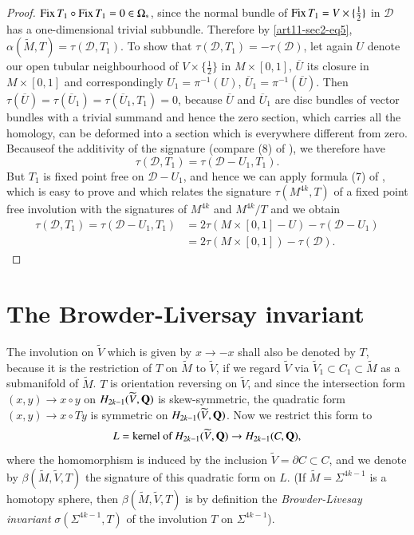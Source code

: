 \begin{proof}
$\operatorname{\mathrm{Fix}} T_{1}\circ \operatorname{\mathrm{Fix}} T_{1}=0\in \Omega_{*}$, since the normal bundle of $\operatorname{\mathrm{Fix}} T_{1}=V\times \{\frac{1}{2}\}$ in $\mathscr{D}$ has a one-dimensional trivial subbundle. Therefore by \eqref{art11-sec2-eq5}, $\alpha(\widetilde{M},T)=\tau(\mathscr{D},T_{1})$. To show that $\tau(\mathscr{D},T_{1})=-\tau(\mathscr{D})$, let again $U$ denote our open tubular neighbourhood of $V\times \{\frac{1}{2}\}$ in $M\times [0,1]$, $\overline{U}$ its closure in $M\times [0,1]$ and correspondingly $U_{1}=\pi^{-1}(U)$, $\overline{U}_{1}=\pi^{-1}(\overline{U})$. Then $\tau(\overline{U})=\tau(\overline{U}_{1})=\tau(\overline{U}_{1},T_{1})=0$, because $\overline{U}$ and $\overline{U}_{1}$ are disc bundles of vector bundles with a trivial summand and hence the zero section, which carries all the homology, can be deformed into a section which is everywhere different from zero. Because\pageoriginale of the additivity of the signature (compare (8) of \cite{art11-key7}), we therefore have
$$
\tau(\mathscr{D},T_{1})=\tau(\mathscr{D}-U_{1},T_{1}).
$$
But $T_{1}$ is fixed point free on $\mathscr{D}-U_{1}$, and hence we can apply formula (7) of \cite{art11-key7}, which is easy to prove and which relates the signature $\tau(M^{4k},T)$ of a fixed point free involution with the signatures of $M^{4k}$ and $M^{4k}/T$ and we obtain
\begin{align*}
\tau(\mathscr{D},T_{1})=\tau(\mathscr{D}-U_{1},T_{1}) &= 2\tau(M\times [0,1]-U)-\tau(\mathscr{D}-U_{1})\\[3pt]
&= 2\tau(M\times [0,1])-\tau(\mathscr{D}).
\end{align*}
\end{proof}

\section{The Browder-Liversay invariant}\label{art11-sec3}

The involution on $\widetilde{V}$ which is given by $x\to-x$ shall also be denoted by $T$, because it is the restriction of $T$ on $\widetilde{M}$ to $\widetilde{V}$, if we regard $\widetilde{V}$ via $\widetilde{V}_{1}\subset C_{1}\subset \widetilde{M}$ as a submanifold of $\widetilde{M}$. $T$ is orientation reversing on $\widetilde{V}$, and since the intersection form $(x,y)\to x\circ y$ on $H_{2k-1}(\widetilde{V},\mathbf{Q})$ is skew-symmetric, the quadratic form $(x,y)\to x\circ Ty$ is symmetric on $H_{2k-1}(\widetilde{V},\mathbf{Q})$. Now we restrict this form to
\setcounter{equation}{0}
\begin{equation}
L=\text{kernel of } H_{2k-1}(\widetilde{V},\mathbf{Q})\to H_{2k-1}(C,\mathbf{Q}),\label{art11-sec3-eq1}
\end{equation}
where the homomorphism is induced by the inclusion $\widetilde{V}=\partial C\subset C$, and we denote by $\beta(\widetilde{M},\widetilde{V},T)$ the signature of this quadratic form on $L$. (If $\widetilde{M}=\Sigma^{4k-1}$ is a homotopy sphere, then $\beta(\widetilde{M},\widetilde{V},T)$ is by definition the {\em Browder-Livesay invariant} \cite{art11-key3} $\sigma(\Sigma^{4k-1},T)$ of the involution $T$ on $\Sigma^{4k-1}$).


